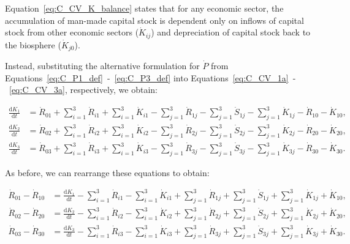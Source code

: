 Equation~\ref{eq:C_CV_K_balance} states that
for any economic sector,
the accumulation of man-made capital stock
is dependent only on inflows of capital stock
from other economic sectors
($\dot{K}_{ij}$)
and depreciation of capital stock back to the
biosphere ($\dot{K}_{j0}$).

Instead,
substituting the alternative formulation for $\dot{P}$
from Equations~\ref{eq:C_P1_def}~-~\ref{eq:C_P3_def}
into Equations~\ref{eq:C_CV_1a}~-~\ref{eq:C_CV_3a},
respectively,
we obtain:

\begin{align} \label{eq:C_CV_1c}
	\frac{\mathrm{d}K_{1}}{\mathrm{d}t}	&
	= \dot{R}_{01}
	+ \sum_{i = 1}^{3}\dot{R}_{i1}
	+ \sum_{i = 1}^{3}\dot{K}_{i1}
	- \sum_{j = 1}^{3}\dot{R}_{1j}
	- \sum_{j = 1}^{3}\dot{S}_{1j}
	- \sum_{j = 1}^{3}\dot{K}_{1j}
	- \dot{R}_{10} 
	- \dot{K}_{10},										\\
	\label{eq:C_CV_2c}
	\frac{\mathrm{d}K_{2}}{\mathrm{d}t}	& 
	=  \dot{R}_{02} 
	+ \sum_{i = 1}^{3}\dot{R}_{i2}
	+ \sum_{i = 1}^{3}\dot{K}_{i2}
	- \sum_{j = 1}^{3}\dot{R}_{2j}
	- \sum_{j = 1}^{3}\dot{S}_{2j}
	- \sum_{j = 1}^{3}\dot{K}_{2j}
	- \dot{R}_{20} 
	- \dot{K}_{20},										\\	
	\label{eq:C_CV_3c}
	\frac{\mathrm{d}K_{3}}{\mathrm{d}t}	&
	=  \dot{R}_{03} 
	+ \sum_{i = 1}^{3}\dot{R}_{i3}
	+ \sum_{i = 1}^{3}\dot{K}_{i3}
	- \sum_{j = 1}^{3}\dot{R}_{3j}
	- \sum_{j = 1}^{3}\dot{S}_{3j}
	- \sum_{j = 1}^{3}\dot{K}_{3j}
	- \dot{R}_{30} 
	- \dot{K}_{30}.										
\end{align}

As before, we can rearrange these equations
to obtain:

\begin{align} \label{eq:C_CV_1d}
	\dot{R}_{01}
	- \dot{R}_{10} 											&
	=\frac{\mathrm{d}K_{1}}{\mathrm{d}t}
	- \sum_{i = 1}^{3}\dot{R}_{i1}
	- \sum_{i = 1}^{3}\dot{K}_{i1}
	+ \sum_{j = 1}^{3}\dot{R}_{1j}
	+ \sum_{j = 1}^{3}\dot{S}_{1j}
	+ \sum_{j = 1}^{3}\dot{K}_{1j}
	+ \dot{K}_{10},											\\
	\label{eq:C_CV_2d}
	\dot{R}_{02} 
	- \dot{R}_{20} 											&
	= \frac{\mathrm{d}K_{2}}{\mathrm{d}t}
	- \sum_{i = 1}^{3}\dot{R}_{i2}
	- \sum_{i = 1}^{3}\dot{K}_{i2}
	+ \sum_{j = 1}^{3}\dot{R}_{2j}
	+ \sum_{j = 1}^{3}\dot{S}_{2j}
	+ \sum_{j = 1}^{3}\dot{K}_{2j}
	+ \dot{K}_{20},											\\	
	\label{eq:C_CV_3d}
	\dot{R}_{03}
	- \dot{R}_{30} 											&
	= \frac{\mathrm{d}K_{3}}{\mathrm{d}t}
	- \sum_{i = 1}^{3}\dot{R}_{i3}
	- \sum_{i = 1}^{3}\dot{K}_{i3}
	+ \sum_{j = 1}^{3}\dot{R}_{3j}
	+ \sum_{j = 1}^{3}\dot{S}_{3j}
	+ \sum_{j = 1}^{3}\dot{K}_{3j}
	+ \dot{K}_{30}.										
\end{align}

